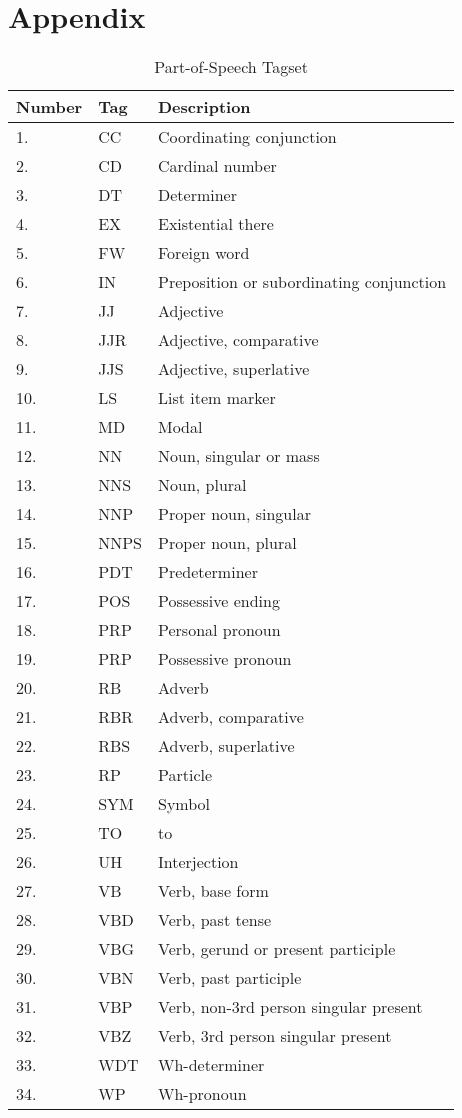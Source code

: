 \chapter{Appendix}

\begin{table}[h]
	\centering
	     \caption{Part-of-Speech Tagset}
     \label{table:AllPOSTags}
    \begin{tabular}{| l | l | l |}
    \hline
    Number & Tag & Description \\ \hline
	\hline
1. & 	CC &	Coordinating conjunction \\ \hline
2. & 	CD &	Cardinal number \\ \hline
3. & 	DT  & Determiner \\ \hline
4. & 	EX  &	Existential there \\ \hline
5. & 	FW &	Foreign word \\ \hline
6. & 	IN  &	Preposition or subordinating conjunction \\ \hline
7. & 	JJ &	Adjective \\ \hline
8. & 	JJR &	Adjective, comparative \\ \hline
9. & 	JJS &	Adjective, superlative \\ \hline
10. & 	LS &	List item marker \\ \hline
11. & 	MD &	Modal \\ \hline
12. & 	NN &	Noun, singular or mass \\ \hline
13. & 	NNS &	Noun, plural \\ \hline
14. & 	NNP& 	Proper noun, singular \\ \hline
15. & 	NNPS &	Proper noun, plural \\ \hline
16. & 	PDT &	Predeterminer \\ \hline
17. & 	POS &	Possessive ending \\ \hline
18. & 	PRP &	Personal pronoun \\ \hline
19. & 	PRP&	Possessive pronoun \\ \hline
20. & 	RB &	Adverb \\ \hline
21. & 	RBR &	Adverb, comparative \\ \hline
22. & 	RBS &	Adverb, superlative \\ \hline
23. & 	RP &	Particle \\ \hline
24. & 	SYM &	Symbol \\ \hline
25. & 	TO &	to \\ \hline
26. & 	UH &	Interjection \\ \hline
27. & 	VB &	Verb, base form \\ \hline
28. & 	VBD &	Verb, past tense \\ \hline
29. & 	VBG &	Verb, gerund or present participle \\ \hline
30. & 	VBN &	Verb, past participle \\ \hline
31. & 	VBP &	Verb, non-3rd person singular present \\ \hline
32. & 	VBZ &	Verb, 3rd person singular present \\ \hline
33. & 	WDT & Wh-determiner \\ \hline
34. & 	WP &	Wh-pronoun  \\ \hline
    \end{tabular}


\end{table}

